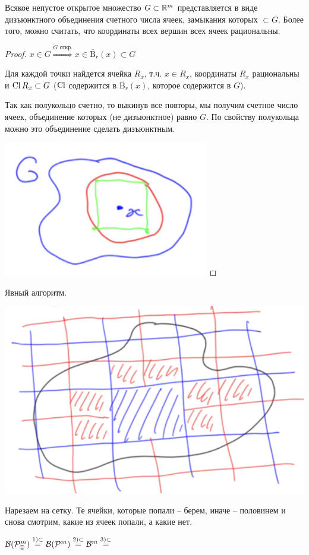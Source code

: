 \begin{theorem}
    Всякое непустое открытое множество $G \subset \mathbb{R}^m$ представляется в виде дизъюнктного объединения
    счетного числа ячеек, замыкания которых $\subset G$. Более того, можно считать, что координаты всех 
    вершин всех ячеек рациональны.
\end{theorem}

\begin{proof}
    $x\in G\overset{G\text{ откр.}}{\Rightarrow} x\in \overline{\text{B}}_{r}(x)\subset G$

    Для каждой точки найдется ячейка $R_x$, т.ч. $x\in R_x$, координаты $R_x$ рациональны и $\operatorname{Cl} R_x \subset G$ ($\operatorname{Cl}$ содержится
    в $\overline{\text{B}}_{r}(x)$, которое содержится в $G$). 
    
    Так как полукольцо счетно, то выкинув все повторы, мы получим счетное число ячеек, объединение которых (не дизъюнктное) равно $G$. По свойству 
    полукольца можно это объединение сделать дизъюнктным.

    \includegraphics[width=0.2\linewidth]{images/23-09-07-8.png}
\end{proof}

\begin{remark}
    Явный алгоритм.
\end{remark}

\includegraphics[width=0.2\linewidth]{images/23-09-07-9.png}

Нарезаем на сетку. Те ячейки, которые попали – берем, иначе – половинем и снова смотрим, какие из ячеек попали, а какие нет.  

\begin{corollary}
    $\mathcal{B}(\mathcal{P}_{\mathbb{Q}}^m)\overset{1) \subset}{=} \mathcal{B}(\mathcal{P}^m)\overset{2) \subset}{=}\mathcal{B}^m \overset{3) \subset}{=}$
\end{corollary}

